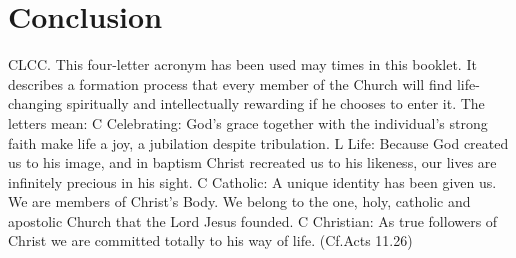 \documentclass{article}        %
\begin{document}
\section{Conclusion}

CLCC. This four-letter acronym has been used may times in this booklet. It
describes a formation process that every member of the Church will find
life-changing spiritually and intellectually rewarding if he chooses to enter
it.
The letters mean:
C Celebrating: God's grace together with the individual's strong faith make life
a joy, a jubilation
despite tribulation.
L Life: Because God created us to his image, and in baptism Christ recreated us
to his likeness, our lives are infinitely precious in his sight.
C Catholic: A unique identity has been given us. We are members of Christ's
Body. We belong to the
one, holy, catholic and apostolic Church that the Lord Jesus founded.
C Christian: As true followers of Christ we are committed totally to his way of
life. (Cf.Acts 11.26)

\end{document}
